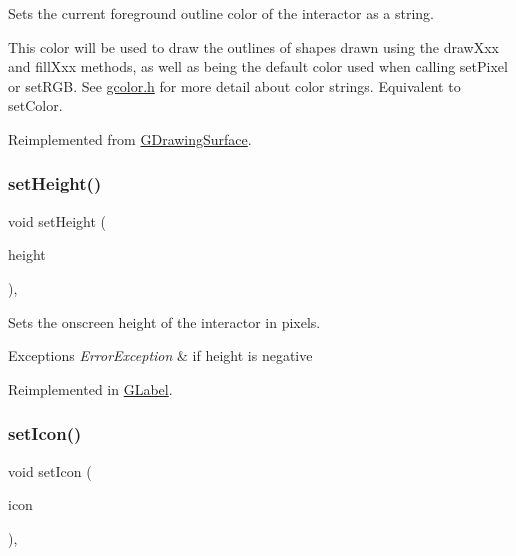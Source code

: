 Sets the current foreground outline color of the interactor as a string. 

This color will be used to draw the outlines of shapes drawn using the draw\+Xxx and fill\+Xxx methods, as well as being the default color used when calling set\+Pixel or set\+R\+GB. See \mbox{\hyperlink{gcolor_8h_source}{gcolor.\+h}} for more detail about color strings. Equivalent to set\+Color. 

Reimplemented from \mbox{\hyperlink{classsgl_1_1GDrawingSurface_af59209aeadea6dfc6d97a2d8531f50e1}{G\+Drawing\+Surface}}.

\mbox{\label{classsgl_1_1GInteractor_a9e280bfc4544dfaf8e4376c4e1a74357}} 
\subsubsection{\texorpdfstring{set\+Height()}{setHeight()}}
{\footnotesize\ttfamily void set\+Height (\begin{DoxyParamCaption}\item[{double}]{height }\end{DoxyParamCaption})\hspace{0.3cm}{\ttfamily [virtual]}, {\ttfamily [inherited]}}



Sets the onscreen height of the interactor in pixels. 


\begin{DoxyExceptions}{Exceptions}
{\em Error\+Exception} & if height is negative \\
\hline
\end{DoxyExceptions}


Reimplemented in \mbox{\hyperlink{classsgl_1_1GLabel_a5eead864d1249c4406f32f9944ed1503}{G\+Label}}.

\mbox{\label{classsgl_1_1GInteractor_a542abfcd7261751352af129c7215ecda}} 
\subsubsection{\texorpdfstring{set\+Icon()}{setIcon()}\hspace{0.1cm}{\footnotesize\ttfamily [1/3]}}
{\footnotesize\ttfamily void set\+Icon (\begin{DoxyParamCaption}\item[{const Q\+Icon \&}]{icon }\end{DoxyParamCaption})\hspace{0.3cm}{\ttfamily [virtual]}, {\ttfamily [inherited]}}



